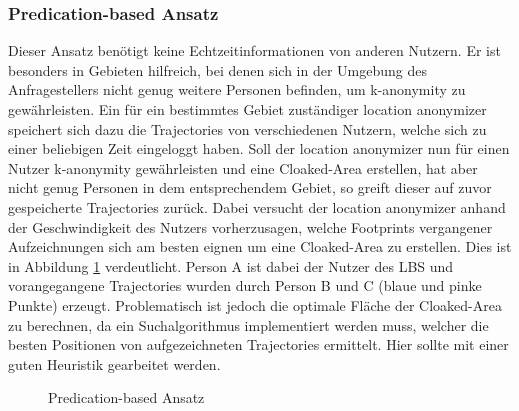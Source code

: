 \subsubsection{Predication-based Ansatz} 
Dieser Ansatz benötigt keine Echtzeitinformationen von anderen Nutzern. Er ist besonders in Gebieten hilfreich, bei denen sich in der Umgebung des Anfragestellers nicht genug weitere Personen befinden, um k-anonymity zu gewährleisten. Ein für ein bestimmtes Gebiet zuständiger location anonymizer speichert sich dazu die Trajectories von verschiedenen Nutzern, welche sich zu einer beliebigen Zeit eingeloggt haben. Soll der location anonymizer nun für einen Nutzer k-anonymity gewährleisten und eine Cloaked-Area erstellen, hat aber nicht genug Personen in dem entsprechendem Gebiet, so greift dieser auf zuvor gespeicherte Trajectories zurück. Dabei versucht der location anonymizer anhand der Geschwindigkeit des Nutzers vorherzusagen, welche Footprints vergangener Aufzeichnungen sich am besten eignen um eine Cloaked-Area zu erstellen. Dies ist in Abbildung \ref{fig_chow2011_PredicationBased-Ansatz} verdeutlicht. Person A ist dabei der Nutzer des LBS und vorangegangene Trajectories wurden durch Person B und C (blaue und pinke Punkte) erzeugt. Problematisch ist jedoch die optimale Fläche der Cloaked-Area zu berechnen, da ein Suchalgorithmus implementiert werden muss, welcher die besten Positionen von aufgezeichneten Trajectories ermittelt. Hier sollte mit einer guten Heuristik gearbeitet werden. 
\begin{figure}[!h]
		\centering
		\caption{Predication-based Ansatz}
		\label{fig_chow2011_PredicationBased-Ansatz}
\end{figure}